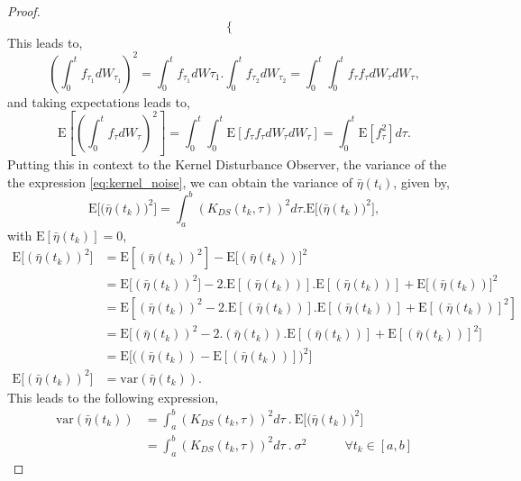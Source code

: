 \documentclass[letterpaper%
, twoside%
, 12pt%
,memoire%
, english%
,creativecommons,hyperref%
]{thETS}
\newcommand{\eop}{\hfill $\sqcap\!\!\!\!\sqcup$} %
\begin{document}
\begin{proof}
\[\begin{cases}
   \end{cases}
\]
This leads to, 
$$
\left(\int_0^t f_{\tau_1} dW_{\tau_1} \right)^2 = \int_0^t f_{\tau_1} dW{\tau_1} . \int_0^t f_{\tau_2} dW_{\tau_2} = \int_0^t \int_0^t f_{\tau} f_{\tau} dW_\tau dW_\tau, 
$$ 
and taking expectations leads to,
$$
\text{E} \left[ \left(  \int_0^t f_\tau dW_\tau \right)^2 \right] = \int_0^t \int_0^t \text{E}[f_{\tau} f_{\tau} dW_\tau dW_\tau] = \int_0^t \text{E}\left[ f_\tau^2\right] d\tau. 
$$ 
Putting this in context to the Kernel Disturbance Observer, the variance of the the expression \ref{eq:kernel_noise}, we can obtain the variance of $\bar{\eta}(t_i)$, given by, 
\begin{equation}
\text{E}\Big[\big(\bar{\eta}(t_k)\big)^2\Big] = \int_a^b \left(K_{DS}(t_k,\tau)\right)^2 d\tau . \text{E}\Big[\big( \bar{\eta}(t_k) \big)^2\Big], 	
\end{equation}
with $\text{E}[\bar{\eta}(t_k)]=0$,
\begin{align*}
\text{E}\big[(\bar{\eta}(t_k))^2] &= \text{E}[(\bar{\eta}(t_k))^2] - \text{E}[(\bar{\eta}(t_k))\big]^2 \\
&= \text{E}\big[(\bar{\eta}(t_k))^2] - 2. \text{E}[(\bar{\eta}(t_k))].\text{E}[(\bar{\eta}(t_k))] + \text{E}[(\bar{\eta}(t_k))\big]^2 \\
&= \text{E}[(\bar{\eta}(t_k))^2 - 2.\text{E}[(\bar{\eta}(t_k))].\text{E}[(\bar{\eta}(t_k))] + \text{E}[(\bar{\eta}(t_k))]^2 ] \\
&= \text{E}\big[(\bar{\eta}(t_k))^2 - 2.(\bar{\eta}(t_k)).\text{E}[(\bar{\eta}(t_k))] + \text{E}[(\bar{\eta}(t_k))]^2 \big] \\
&= \text{E}\Big[\big((\bar{\eta}(t_k))- \text{E}[(\bar{\eta}(t_k))]\big)^2 \Big] \\
\text{E}\big[(\bar{\eta}(t_k))^2] &= \text{var}(\bar{\eta}(t_k)).
\end{align*}
This leads to the following expression,
\begin{equation} \label{eqn:stoch1}
\begin{aligned}
\text{var}(\bar{\eta}(t_k)) &= \int_a^b \left(K_{DS}(t_k,\tau)\right)^2 d\tau \ . \ \text{E}\Big[\big( \bar{\eta}(t_k) \big)^2\Big] \\
&= \int_a^b \left(K_{DS}(t_k,\tau)\right)^2 d\tau \ . \  \sigma^2 \quad \quad \quad \forall t_k \in [a,b]
\end{aligned}
\end{equation}
\end{proof}
\end{document}
